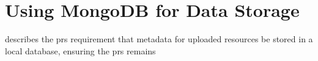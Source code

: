 \section{Using MongoDB for Data Storage}
\label{sec:impl_mongodb}

 describes the \acrfull{prs} requirement that metadata for uploaded resources be stored in a local database, ensuring the \acrshort{prs} remains 
